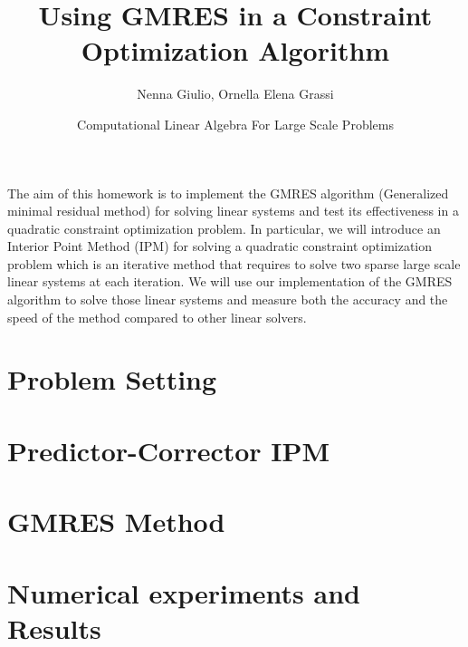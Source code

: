 \documentclass{article}
\title{Using GMRES in a Constraint Optimization Algorithm}
\author{Nenna Giulio, Ornella Elena Grassi}
\date{Computational Linear Algebra For Large Scale Problems}
\numberwithin{equation}{section}
\theoremstyle{definition}
\theoremstyle{plain}
\theoremstyle{definition}
\theoremstyle{remark}
\begin{document}
\maketitle
The aim of this homework is to implement the GMRES algorithm (Generalized minimal residual method) for solving linear systems and test its effectiveness in a quadratic constraint optimization problem. In particular, we will introduce an Interior Point Method (IPM) for solving a quadratic constraint optimization problem which is an iterative method that requires to solve two sparse large scale linear systems at each iteration. We will use our implementation of the GMRES algorithm to solve those linear systems and measure both the accuracy and the speed of the method compared to other linear solvers.

\section{Problem Setting}

\section{Predictor-Corrector IPM}

\section{GMRES Method}

\section{Numerical experiments and Results}

\end{document}
